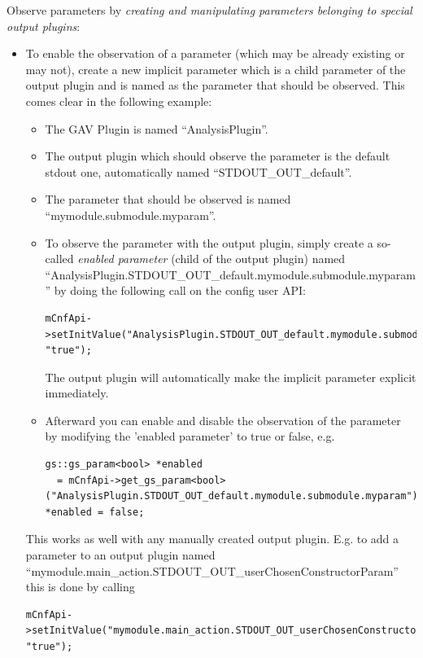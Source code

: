 Observe parameters by {\em creating and manipulating parameters belonging to special output plugins}:
\begin{itemize}
  \item To enable the observation of a parameter (which may be already existing or may not), create a new implicit parameter which is a child parameter of the output plugin and is named as the parameter that should be observed. This comes clear in the following example:
	\begin{itemize}
  		\item The GAV Plugin is named ``{\sffamily AnalysisPlugin}''.
  		\item The output plugin which should observe the parameter is the default stdout one, automatically named \mbox{``{\sffamily STDOUT\_OUT\_default}''}.
		\item The parameter that should be observed is named ``{\sffamily mymodule.submodule.myparam}''.
		\item To observe the parameter with the output plugin, simply create a so-called {\em enabled parameter} (child of the output plugin) named \mbox{``{\sffamily AnalysisPlugin.STDOUT\_OUT\_default.mymodule.submodule.myparam}''} by doing the following call on the config user API:  
		\begin{lstlisting}
mCnfApi->setInitValue("AnalysisPlugin.STDOUT_OUT_default.mymodule.submodule.myparam", "true");
		\end{lstlisting}
		The output plugin will automatically make the implicit parameter explicit immediately.
		\item Afterward you can enable and disable the observation of the parameter by modifying the 'enabled parameter' to true or false, e.g. 
		\begin{lstlisting}
gs::gs_param<bool> *enabled
  = mCnfApi->get_gs_param<bool>("AnalysisPlugin.STDOUT_OUT_default.mymodule.submodule.myparam");
*enabled = false;
		\end{lstlisting}
	\end{itemize}

This works as well with any manually created output plugin. E.g. to add a parameter to an output plugin named \mbox{``{\sffamily mymodule.main\_action.STDOUT\_OUT\_userChosenConstructorParam}''} this is done by calling
		\begin{lstlisting}
mCnfApi->setInitValue("mymodule.main_action.STDOUT_OUT_userChosenConstructorParam.mymodule.param2", "true");
		\end{lstlisting}

\end{itemize}


